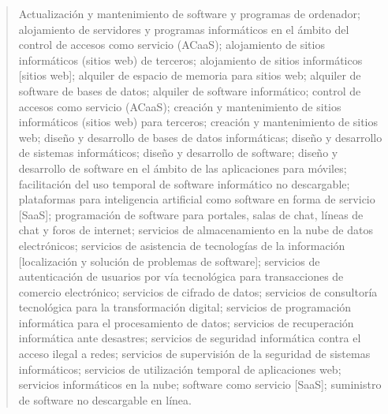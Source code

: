 \begin{quote}
\small
Actualización y mantenimiento de software y programas de ordenador; alojamiento de servidores y programas informáticos en el ámbito del control de accesos como servicio (ACaaS); alojamiento de sitios informáticos (sitios web) de terceros; alojamiento de sitios informáticos [sitios web]; alquiler de espacio de memoria para sitios web; alquiler de software de bases de datos; alquiler de software informático; control de accesos como servicio (ACaaS); creación y mantenimiento de sitios informáticos (sitios web) para terceros; creación y mantenimiento de sitios web; diseño y desarrollo de bases de datos informáticas; diseño y desarrollo de sistemas informáticos; diseño y desarrollo de software; diseño y desarrollo de software en el ámbito de las aplicaciones para móviles; facilitación del uso temporal de software informático no descargable; plataformas para inteligencia artificial como software en forma de servicio [SaaS]; programación de software para portales, salas de chat, líneas de chat y foros de internet; servicios de almacenamiento en la nube de datos electrónicos; servicios de asistencia de tecnologías de la información [localización y solución de problemas de software]; servicios de autenticación de usuarios por vía tecnológica para transacciones de comercio electrónico; servicios de cifrado de datos; servicios de consultoría tecnológica para la transformación digital; servicios de programación informática para el procesamiento de datos; servicios de recuperación informática ante desastres; servicios de seguridad informática contra el acceso ilegal a redes; servicios de supervisión de la seguridad de sistemas informáticos; servicios de utilización temporal de aplicaciones web; servicios informáticos en la nube; software como servicio [SaaS]; suministro de software no descargable en línea.
\normalsize
\end{quote}
